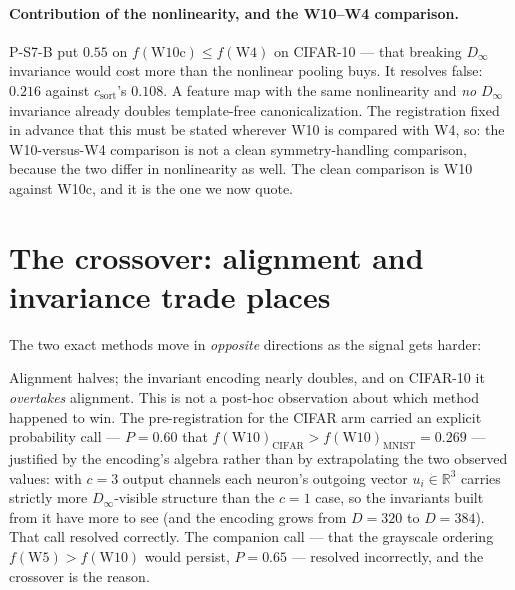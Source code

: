 \documentclass[10pt,twocolumn,letterpaper]{article}
\theoremstyle{definition}
\newcommand{\R}{\mathbb{R}}
\newcommand{\Dinf}{D_\infty}
\newcommand{\csort}{c_{\mathrm{sort}}}
\begin{document}
\paragraph{Contribution of the nonlinearity, and the W10--W4 comparison.}
P-S7-B put $0.55$ on $f(\mathrm{W10c}) \le f(\mathrm{W4})$ on CIFAR-10 --- that breaking $\Dinf$
invariance would cost more than the nonlinear pooling buys. It resolves false: $0.216$ against
$\csort$'s $0.108$. A feature map with the same nonlinearity and \emph{no} $\Dinf$ invariance
already doubles template-free canonicalization. The registration fixed in advance that this must be
stated wherever W10 is compared with W4, so: the W10-versus-W4 comparison is not a clean
symmetry-handling comparison, because the two differ in nonlinearity as well. The clean comparison
is W10 against W10c, and it is the one we now quote.

\section{The crossover: alignment and invariance trade places}\label{sec:crossover}

The two exact methods move in \emph{opposite} directions as the signal gets harder:
\begin{center}\small
{}
\end{center}

Alignment halves; the invariant encoding nearly doubles, and on CIFAR-10 it \emph{overtakes}
alignment. This is not a post-hoc observation about which method happened to win. The
pre-registration for the CIFAR arm carried an explicit probability call --- $P = 0.60$ that
$f(\mathrm{W10})_{\text{CIFAR}} > f(\mathrm{W10})_{\text{MNIST}} = 0.269$ --- justified by the
encoding's algebra rather than by extrapolating the two observed values: with $c = 3$ output
channels each neuron's outgoing vector $u_i \in \R^3$ carries strictly more $\Dinf$-visible
structure than the $c = 1$ case, so the invariants built from it have more to see (and the
encoding grows from $D = 320$ to $D = 384$). That call resolved correctly. The companion call ---
that the grayscale ordering $f(\mathrm{W5}) > f(\mathrm{W10})$ would persist, $P = 0.65$ ---
resolved incorrectly, and the crossover is the reason.
\end{document}
